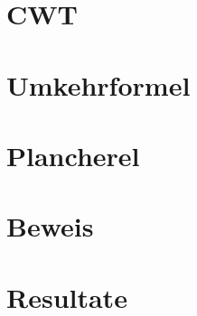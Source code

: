 %
%
%

\begin{frame}
\titlepage
\end{frame}

\section{CWT}


\section{Umkehrformel}


\section{Plancherel}


\section{Beweis}


\section{Resultate}


